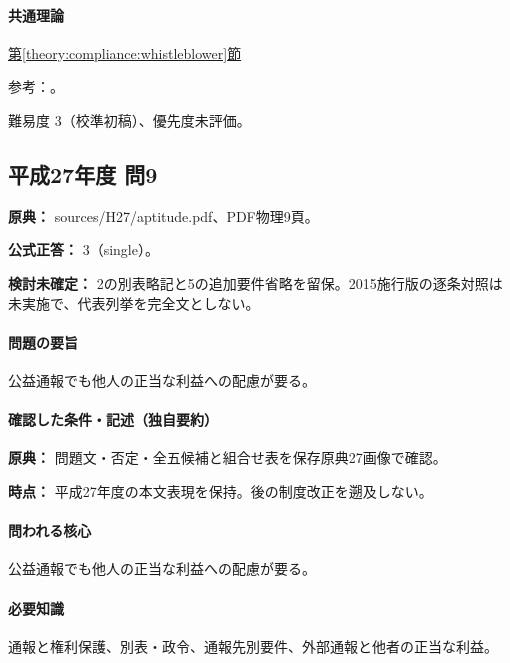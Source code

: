 \paragraph{共通理論} \hyperref[theory:compliance:whistleblower]{第\ref*{theory:compliance:whistleblower}節}

\par 参考：\cite{caa_handbook_pre2022,saf53_whistle_oldfaq}。

\par 難易度 3（校準初稿）、優先度未評価。

\subsection{平成27年度 問9}
\label{q:h27-reg-apt-09}

\noindent\textbf{原典：} sources/H27/aptitude.pdf、PDF物理9頁。

\textbf{公式正答：} 3（single）。

\par\textbf{検討未確定：} 2の別表略記と5の追加要件省略を留保。2015施行版の逐条対照は未実施で、代表列挙を完全文としない。

\paragraph{問題の要旨} 公益通報でも他人の正当な利益への配慮が要る。

\paragraph{確認した条件・記述（独自要約）}\mbox{}\par

\noindent\textbf{原典：} 問題文・否定・全五候補と組合せ表を保存原典27画像で確認。\par

\noindent\textbf{時点：} 平成27年度の本文表現を保持。後の制度改正を遡及しない。\par

\paragraph{問われる核心} 公益通報でも他人の正当な利益への配慮が要る。

\paragraph{必要知識} 通報と権利保護、別表・政令、通報先別要件、外部通報と他者の正当な利益。

